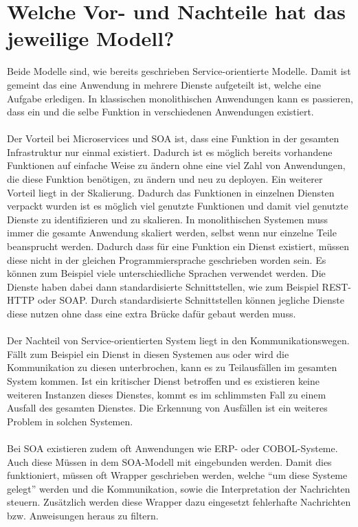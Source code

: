 \section{Welche Vor- und Nachteile hat das jeweilige Modell?}
\label{sec:VorNachteile}
Beide Modelle sind, wie bereits geschrieben Service-orientierte Modelle. Damit ist gemeint das eine Anwendung in mehrere Dienste aufgeteilt ist, welche eine Aufgabe erledigen. In klassischen monolithischen Anwendungen kann es passieren, dass ein und die selbe Funktion in verschiedenen Anwendungen existiert.
\\\\
Der Vorteil bei Microservices und SOA ist, dass eine Funktion in der gesamten Infrastruktur nur einmal existiert. Dadurch ist es möglich bereits vorhandene Funktionen auf einfache Weise zu ändern ohne eine viel Zahl von Anwendungen, die diese Funktion benötigen, zu ändern und neu zu deployen.
Ein weiterer Vorteil liegt in der Skalierung. Dadurch das Funktionen in einzelnen Diensten verpackt wurden ist es möglich viel genutzte Funktionen und damit viel genutzte Dienste zu identifizieren und zu skalieren. In monolithischen Systemen muss immer die gesamte Anwendung skaliert werden, selbst wenn nur einzelne Teile beansprucht werden.
Dadurch dass für eine Funktion ein Dienst existiert, müssen diese nicht in der gleichen Programmiersprache geschrieben worden sein. Es können zum Beispiel viele unterschiedliche Sprachen verwendet werden. Die Dienste haben dabei dann standardisierte Schnittstellen, wie zum Beispiel REST-HTTP oder SOAP. Durch standardisierte Schnittstellen können jegliche Dienste diese nutzen ohne dass eine extra Brücke dafür gebaut werden muss.
\\\\
Der Nachteil von Service-orientierten System liegt in den Kommunikationswegen. Fällt zum Beispiel ein Dienst in diesen Systemen aus oder wird die Kommunikation zu diesen unterbrochen, kann es zu Teilausfällen im gesamten System kommen. Ist ein kritischer Dienst betroffen und es existieren keine weiteren Instanzen dieses Dienstes, kommt es im schlimmsten Fall zu einem Ausfall des gesamten Dienstes. Die Erkennung von Ausfällen ist ein weiteres Problem in solchen Systemen.
\\\\
Bei SOA existieren zudem oft Anwendungen wie ERP- oder COBOL-Systeme. Auch diese Müssen in dem SOA-Modell mit eingebunden werden. Damit dies funktioniert, müssen oft Wrapper geschrieben werden, welche "`um diese Systeme gelegt"' werden und die Kommunikation, sowie die Interpretation der Nachrichten steuern. Zusätzlich werden diese Wrapper dazu eingesetzt fehlerhafte Nachrichten bzw. Anweisungen heraus zu filtern.

